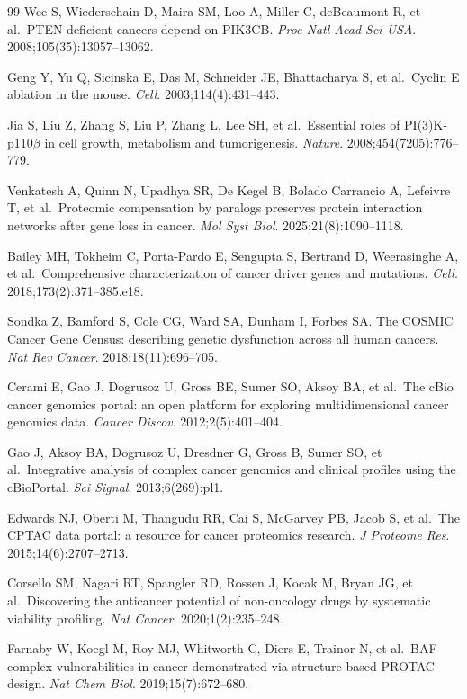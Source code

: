 \documentclass[11pt,a4paper]{article}
\begin{document}
\begin{thebibliography}{99}
 Wee S, Wiederschain D, Maira SM, Loo A, Miller C, deBeaumont R, et al.\ PTEN-deficient cancers depend on PIK3CB. \textit{Proc Natl Acad Sci USA}. 2008;105(35):13057--13062.

 Geng Y, Yu Q, Sicinska E, Das M, Schneider JE, Bhattacharya S, et al.\ Cyclin E ablation in the mouse. \textit{Cell}. 2003;114(4):431--443.

 Jia S, Liu Z, Zhang S, Liu P, Zhang L, Lee SH, et al.\ Essential roles of PI(3)K-p110$\beta$ in cell growth, metabolism and tumorigenesis. \textit{Nature}. 2008;454(7205):776--779.

 Venkatesh A, Quinn N, Upadhya SR, De Kegel B, Bolado Carrancio A, Lefeivre T, et al.\ Proteomic compensation by paralogs preserves protein interaction networks after gene loss in cancer. \textit{Mol Syst Biol}. 2025;21(8):1090--1118.

 Bailey MH, Tokheim C, Porta-Pardo E, Sengupta S, Bertrand D, Weerasinghe A, et al.\ Comprehensive characterization of cancer driver genes and mutations. \textit{Cell}. 2018;173(2):371--385.e18.

 Sondka Z, Bamford S, Cole CG, Ward SA, Dunham I, Forbes SA. The COSMIC Cancer Gene Census: describing genetic dysfunction across all human cancers. \textit{Nat Rev Cancer}. 2018;18(11):696--705.

 Cerami E, Gao J, Dogrusoz U, Gross BE, Sumer SO, Aksoy BA, et al.\ The cBio cancer genomics portal: an open platform for exploring multidimensional cancer genomics data. \textit{Cancer Discov}. 2012;2(5):401--404.

 Gao J, Aksoy BA, Dogrusoz U, Dresdner G, Gross B, Sumer SO, et al.\ Integrative analysis of complex cancer genomics and clinical profiles using the cBioPortal. \textit{Sci Signal}. 2013;6(269):pl1.

 Edwards NJ, Oberti M, Thangudu RR, Cai S, McGarvey PB, Jacob S, et al.\ The CPTAC data portal: a resource for cancer proteomics research. \textit{J Proteome Res}. 2015;14(6):2707--2713.

 Corsello SM, Nagari RT, Spangler RD, Rossen J, Kocak M, Bryan JG, et al.\ Discovering the anticancer potential of non-oncology drugs by systematic viability profiling. \textit{Nat Cancer}. 2020;1(2):235--248.

 Farnaby W, Koegl M, Roy MJ, Whitworth C, Diers E, Trainor N, et al.\ BAF complex vulnerabilities in cancer demonstrated via structure-based PROTAC design. \textit{Nat Chem Biol}. 2019;15(7):672--680.


\end{thebibliography}
\end{document}
